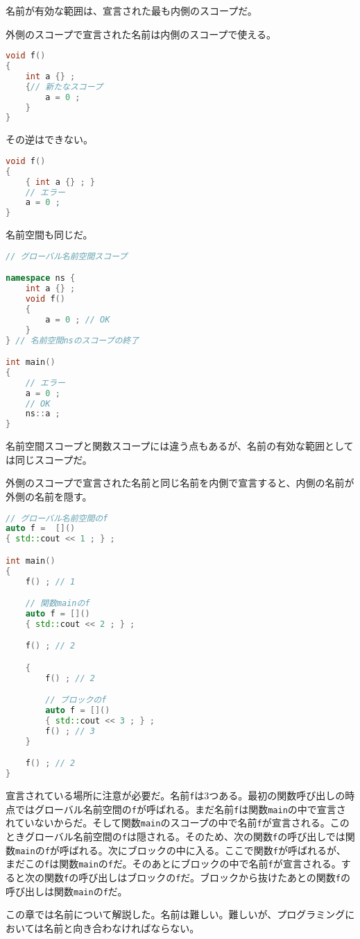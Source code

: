 名前が有効な範囲は、宣言された最も内側のスコープだ。

外側のスコープで宣言された名前は内側のスコープで使える。

\begin{lstlisting}[language={C++}]
void f()
{
    int a {} ;
    {// 新たなスコープ
        a = 0 ;
    }
}
\end{lstlisting}

その逆はできない。

\begin{lstlisting}[language={C++}]
void f()
{
    { int a {} ; }
    // エラー
    a = 0 ;
}
\end{lstlisting}

名前空間も同じだ。

\ifTombow\enlargethispage{3mm}\fi
\begin{lstlisting}[language={C++}]
// グローバル名前空間スコープ

namespace ns {
    int a {} ;
    void f()
    {
        a = 0 ; // OK
    }
} // 名前空間nsのスコープの終了

int main()
{
    // エラー
    a = 0 ;
    // OK 
    ns::a ;
}
\end{lstlisting}

名前空間スコープと関数スコープには違う点もあるが、名前の有効な範囲としては同じスコープだ。

外側のスコープで宣言された名前と同じ名前を内側で宣言すると、内側の名前が外側の名前を隠す。

\begin{lstlisting}[language={C++}]
// グローバル名前空間のf
auto f =  []()
{ std::cout << 1 ; } ;

int main()
{
    f() ; // 1

    // 関数mainのf
    auto f = []()
    { std::cout << 2 ; } ;

    f() ; // 2

    {
        f() ; // 2

        // ブロックのf
        auto f = []()
        { std::cout << 3 ; } ;
        f() ; // 3
    }

    f() ; // 2
}
\end{lstlisting}

宣言されている場所に注意が必要だ。名前\texttt{f}は3つある。最初の関数呼び出しの時点ではグローバル名前空間の\texttt{f}が呼ばれる。まだ名前\texttt{f}は関数\texttt{main}の中で宣言されていないからだ。そして関数\texttt{main}のスコープの中で名前\texttt{f}が宣言される。このときグローバル名前空間の\texttt{f}は隠される。そのため、次の関数\texttt{f}の呼び出しでは関数\texttt{main}の\texttt{f}が呼ばれる。次にブロックの中に入る。ここで関数\texttt{f}が呼ばれるが、まだこの\texttt{f}は関数\texttt{main}の\texttt{f}だ。そのあとにブロックの中で名前\texttt{f}が宣言される。すると次の関数\texttt{f}の呼び出しはブロックの\texttt{f}だ。ブロックから抜けたあとの関数\texttt{f}の呼び出しは関数\texttt{main}の\texttt{f}だ。

この章では名前について解説した。名前は難しい。難しいが、プログラミングにおいては名前と向き合わなければならない。

